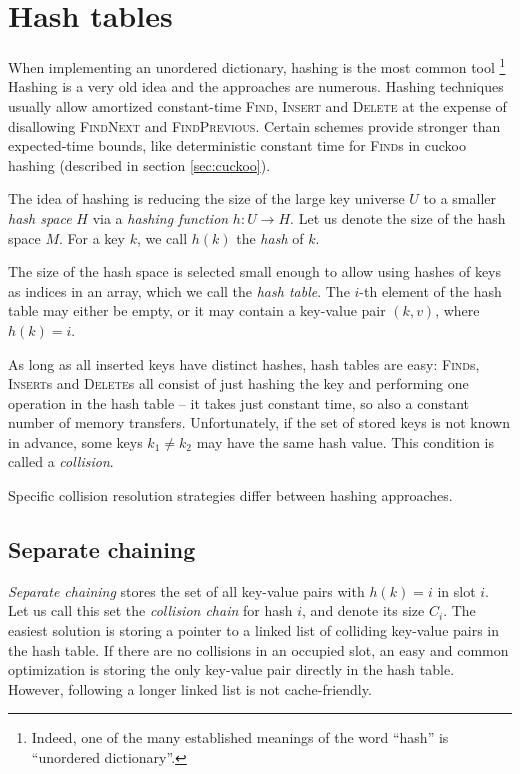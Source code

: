 \chapter{Hash tables}
\label{chapter:hashing}
When implementing an unordered dictionary, hashing is the most common tool
\footnote{Indeed, one of the many established meanings of the word ``hash''
	is ``unordered dictionary''.}
Hashing is a very old idea and the approaches are numerous. Hashing
techniques usually allow amortized constant-time \textsc{Find}, \textsc{Insert}
and \textsc{Delete} at the expense of disallowing \textsc{FindNext} and
\textsc{FindPrevious}. Certain schemes provide stronger than expected-time
bounds, like deterministic constant time for \textsc{Find}s in cuckoo hashing
(described in section \ref{sec:cuckoo}).

The idea of hashing is reducing the size of the large key universe $U$ to
a smaller \emph{hash space} $H$ via a \emph{hashing function}
$h\mathop{:}U\rightarrow H$.
Let us denote the size of the hash space $M$.
For a key $k$, we call $h(k)$ the \emph{hash} of $k$.

The size of the hash space is selected small enough to allow using hashes
of keys as indices in an array, which we call the \emph{hash table}.
The $i$-th element of the hash table may either be empty, or it may contain
a key-value pair $(k,v)$, where $h(k)=i$.


As long as all inserted keys have distinct hashes, hash tables are easy:
\textsc{Find}s, \textsc{Insert}s and \textsc{Delete}s all consist of just
hashing the key and performing one operation in the hash table -- it takes just
constant time, so also a constant number of memory transfers.
Unfortunately, if the set of stored keys is not known in advance,
some keys $k_1\neq k_2$ may have the same hash value.
This condition is called a \emph{collision}.

Specific collision resolution strategies differ between hashing approaches.

\section{Separate chaining}
\emph{Separate chaining} stores the set of all key-value pairs with
$h(k)=i$ in slot $i$. Let us call this set the \emph{collision chain} for hash
$i$, and denote its size $C_i$. The easiest solution is storing a pointer to
a linked list of colliding key-value pairs in the hash table. If there are no
collisions in an occupied slot, an easy and common optimization is storing
the only key-value pair directly in the hash table. However, following a longer
linked list is not cache-friendly.

